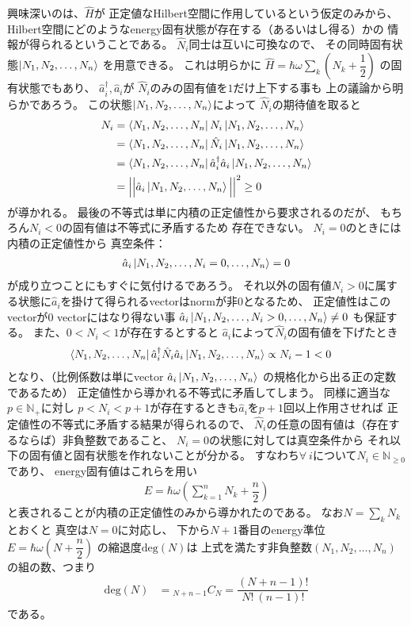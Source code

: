 興味深いのは、$ \hat{H} $が
正定値なHilbert空間に作用しているという仮定のみから、
Hilbert空間にどのようなenergy固有状態が存在する（あるいはし得る）かの
情報が得られるということである。
$\hat{N}_i$同士は互いに可換なので、
その同時固有状態$\ket{N_1, N_2,\dots, N_n}$
を用意できる。
これは明らかに
$ \hat{H} = \hbar\omega
\sum_k
\left(
    \hat{N}_k
    +
    \dfrac{ 1 }{ 2 }
\right) $
の固有状態でもあり、
$\hat{a}^\dagger_i, \hat{a}_i$が
$\hat{N}_i$のみの固有値を$1$だけ上下する事も
上の議論から明らかであろう。
この状態$\ket{N_1, N_2,\dots, N_n}$によって
$\hat{N}_i$の期待値を取ると
\begin{align}
    N_i &=
    \bra{N_1, N_2,\dots, N_n} N_i \ket{N_1, N_2,\dots, N_n}
\notag\\&=
    \bra{N_1, N_2,\dots, N_n} \hat{N}_i \ket{N_1, N_2,\dots, N_n}
\notag\\&=
    \bra{N_1, N_2,\dots, N_n}
    \hat{a}^\dagger_i\hat{a}_i
    \ket{N_1, N_2,\dots, N_n}
\notag\\&=
    \Big|\Big|
        \hat{a}_i \ket{N_1, N_2,\dots, N_n}
    \Big|\Big|^2 \ge 0
\end{align}
が導かれる。
最後の不等式は単に内積の正定値性から要求されるのだが、
もちろん$N_i < 0$の固有値は不等式に矛盾するため
存在できない。
$N_i = 0$のときには内積の正定値性から
真空条件：
\begin{align}
    \hat{a}_i \ket{N_1, N_2,\dots, N_i = 0,\dots, N_n} = 0
\label{vacuum of number operator}
\end{align}
が成り立つことにもすぐに気付けるであろう。
それ以外の固有値$N_i > 0$に属する状態に$\hat{a}_i$を掛けて得られるvectorはnormが非$0$となるため、
正定値性はこのvectorが$0$ vectorにはなり得ない事
$\hat{a}_i \ket{N_1, N_2,\dots, N_i > 0,\dots, N_n} \neq 0$
も保証する。
また、$0<N_i<1$が存在するとすると
$\hat{a}_i$によって$\hat{N}_i$の固有値を下げたとき
\begin{align}
    \bra{N_1, N_2,\dots, N_n}
        \hat{a}_i^\dagger \hat{N}_i \hat{a}_i
    \ket{N_1, N_2,\dots, N_n}
    &\propto
    N_i - 1 < 0
\end{align}
となり、（比例係数は単にvector
$\hat{a}_i \ket{N_1, N_2,\dots, N_n}$
の規格化から出る正の定数であるため）
正定値性から導かれる不等式に矛盾してしまう。
同様に適当な$p\in\mathbb{N}_+$に対し
$p<N_i<p+1$が存在するときも$\hat{a}_i$を$p+1$回以上作用させれば
正定値性の不等式に矛盾する結果が得られるので、
$\hat{N}_i$の任意の固有値は（存在するならば）非負整数であること、
$N_i = 0$の状態に対しては真空条件から
それ以下の固有値と固有状態を作れないことが分かる。
すなわち$\forall\ i$について$N_i \in \mathbb{N}_{\ge 0}$であり、
energy固有値はこれらを用い
\begin{align}
    E = \hbar\omega
    \left(
    \sum_{k=1}^n
        N_k
    +
        \dfrac{ n }{ 2 }
    \right)
\end{align}
と表されることが内積の正定値性のみから導かれたのである。
なお$N = \sum_k N_k$とおくと
真空は$N=0$に対応し、
下から$N+1$番目のenergy準位
$E = \hbar \omega \left(N + \dfrac{n}{2} \right) $
の縮退度$\mathrm{deg}(N)$は
上式を満たす非負整数$(N_1, N_2,\dots, N_n)$の組の数、つまり
\begin{align}
    \mathrm{deg}(N)
    &=
    {}_{N + n-1}C_{N}
    =
    \dfrac{(N+n-1)!}{N!\ (n-1)!}
\end{align}
である。

